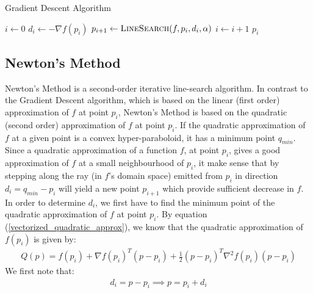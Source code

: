 \begin{algorithm}[ht]
  \caption{Gradient Descent Algorithm}
  \label{alg:gradient_descent_algorithm}
  \begin{algorithmic}[1]
      \State $i \leftarrow 0$
        \State $d_i \leftarrow -\nabla f \left(p_i\right)$
        \State $p_{i+1} \leftarrow \Call{LineSearch}{f, p_i, d_i, \alpha}$
        \State $i \leftarrow i + 1$
      \EndWhile
      \State \Return $p_i$
    \EndFunction
  \end{algorithmic}
\end{algorithm}
\subsection{Newton's Method}
Newton's Method is a second-order iterative line-search algorithm. In contrast to the Gradient Descent algorithm, which is based on the linear (first order) approximation of $f$ at point $p_i$, Newton's Method is based on the quadratic (second order) approximation of $f$ at point $p_i$. If the quadratic approximation of $f$ at a given point is a convex hyper-paraboloid, it has a minimum point $q_{min}$. Since a quadratic approximation of a function $f$, at point $p_i$, gives a good approximation of $f$ at a small neighbourhood of $p_i$, it make sense that by stepping along the ray (in $f$'s domain space) emitted from $p_i$ in direction $d_i = q_{min} - p_i$ will yield a new point $p_{i+1}$ which provide sufficient decrease in $f$.
In order to determine $d_i$, we first have to find the minimum point of the quadratic approximation of $f$ at point $p_i$. By equation (\ref{vectorized_quadratic_approx}), we know that the quadratic approximation of $f\left(p_i\right)$ is given by:
\begin{equation}\label{vectorized_quadratic_approx_p}
\begin{split}
Q\left(p\right) = f\left(p_i\right) + \nabla f\left(p_i\right)^T\left(p-p_i\right) + \frac{1}{2}\left(p-p_i\right)^T\nabla^2 f\left(p_i\right)\left(p-p_i\right)
\end{split}
\end{equation}
We first note that:
\begin{equation}\label{d_i_p_i_p}
\begin{split}
d_i = p - p_i \implies p = p_i + d_i
\end{split}
\end{equation}
